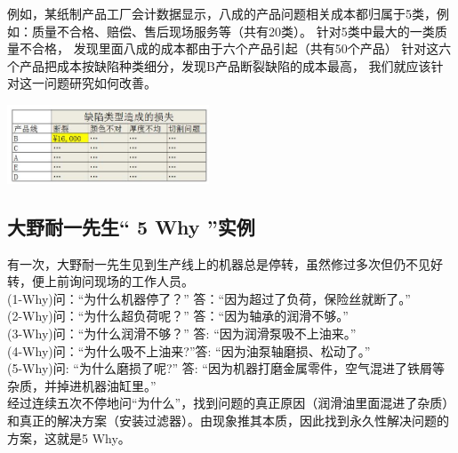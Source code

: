 例如，某纸制产品工厂会计数据显示，八成的产品问题相关成本都归属于5类，例如：质量不合格、赔偿、售后现场服务等（共有20类）。
针对5类中最大的一类质量不合格，
发现里面八成的成本都由于六个产品引起（共有50个产品）
针对这六个产品把成本按缺陷种类细分，发现B产品断裂缺陷的成本最高，
我们就应该针对这一问题研究如何改善。


\includegraphics[width=6cm]{Ar2_缺陷类型造成的损失.jpg}

\hypertarget{ux5927ux91ceux8010ux4e00ux5148ux751f-5-why-ux5b9eux4f8b}{%
\subsection{大野耐一先生`` 5 Why
''实例}\label{ux5927ux91ceux8010ux4e00ux5148ux751f-5-why-ux5b9eux4f8b}}

有一次，大野耐一先生见到生产线上的机器总是停转，虽然修过多次但仍不见好转，便上前询问现场的工作人员。\\
(1-Why)问：``为什么机器停了？'' 答：``因为超过了负荷，保险丝就断了。''\\
(2-Why)问：``为什么超负荷呢？'' 答：``因为轴承的润滑不够。''\\
(3-Why)问：``为什么润滑不够？'' 答: ``因为润滑泵吸不上油来。''\\
(4-Why)问：``为什么吸不上油来?''答: ``因为油泵轴磨损、松动了。''\\
(5-Why)问: ``为什么磨损了呢?'' 答:
``因为机器打磨金属零件，空气混进了铁屑等杂质，并掉进机器油缸里。''\\
经过连续五次不停地问``为什么''，找到问题的真正原因（润滑油里面混进了杂质）和真正的解决方案（安装过滤器）。由现象推其本质，因此找到永久性解决问题的方案，这就是5
Why。




